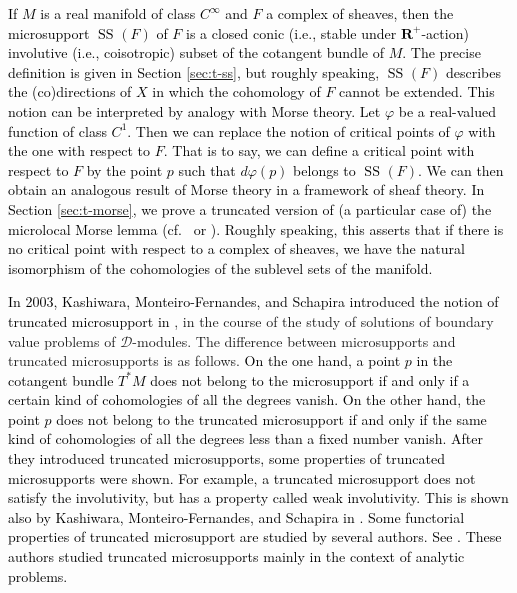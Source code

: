 ﻿\documentclass[a4paper,leqno,dvipdfmx]{jsarticle}
\theoremstyle{definition}
\newcommand{\rr}{\mathbf{R}}
\newcommand{\mcal}{\mathcal}
\numberwithin{equation}{section}
\newcommand{\muS}[1][]{\mathop{\mathrm{SS}}\nolimits_{#1}}
\theoremstyle{mystyle}
\newcommand{\cotb}[1][]{T^{\ast}{#1}}
\begin{document}
\textcolor{black}{If \(M\) is a real manifold of class \(C^{\infty}\) 
and \(F\) a complex of sheaves, 
then the microsupport \(\muS[](F)\) of \(F\) is 
a closed conic (i.e., stable 
under \(\rr^{+}\)-action) involutive (i.e., coisotropic) subset 
of the cotangent bundle of \(M\). 
The precise definition is given in Section \ref{sec:t-ss}, 
but roughly speaking, \(\muS[](F)\) describes the (co)directions 
of \(X\) in which the cohomology of \(F\) cannot be extended. 
This notion can be interpreted by analogy with Morse theory. 
Let \(\varphi\) be a real-valued function of class \(C^1\). 
Then we can replace 
the notion of critical points of \(\varphi\) with 
\textcolor{black}{the} one with respect to \(F\). 
That is to say, we can define a critical point 
with respect to \(F\) by the point \(p\) 
such that \(d\varphi(p)\) belongs to \(\muS[](F)\). 
We can then obtain \textcolor{black}{an} analogous result 
of Morse theory in a
framework of sheaf theory. 
\textcolor{black}{In Section \ref{sec:t-morse}, we prove a truncated version 
of (a particular case of) 
the microlocal Morse lemma (cf.\ \cite[Proposition 1.8]{GKS12} 
or \cite[Corollary 5.4.19]{KS90}). 
Roughly speaking, this asserts that 
if there is no critical point with respect 
to a complex of sheaves, 
we have the natural isomorphism of the cohomologies 
of the sublevel sets of the manifold.}}


\textcolor{black}{In 2003, 
Kashiwara, Monteiro-Fernandes, and Schapira
introduced the notion of truncated microsupport in \cite{KFS03a}}, 
in the course of the study of solutions of 
boundary value problems of \(\mcal{D}\)-modules. 
The difference between 
microsupports and truncated microsupports 
is as follows. 
\textcolor{black}{On the one hand, 
a point \(p\) in the cotangent bundle \(\cotb[M]\) does 
not belong to the microsupport if and only if 
a certain kind of cohomologies of 
all the degrees vanish. 
On the other hand, the point \(p\) does 
not belong to the truncated microsupport if and only if 
the same kind of cohomologies of all the degrees less than 
a fixed number vanish.}
\textcolor{black}
{After they introduced truncated microsupports, 
\textcolor{black}{some} properties 
of truncated microsupports were shown. 
For example, 
\textcolor{black}{a truncated microsupport 
does not satisfy the involutivity, but
has a property called weak involutivity.} 
This is shown also 
by Kashiwara, Monteiro-Fernandes, 
and Schapira in \cite{KFS03b}. 
Some functorial properties of truncated microsupport are 
studied by several authors. See \cite{KFS03a,FM07}. 
These authors studied truncated microsupports
mainly in the context of analytic problems.}
\end{document}
